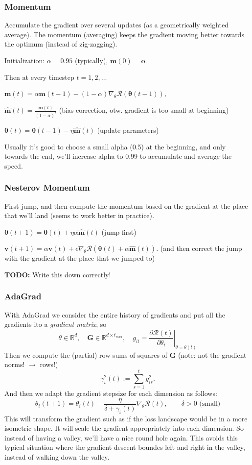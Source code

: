 \documentclass[a2paper,8pt]{extarticle}
\newcommand{\R}{\mathbb{R}}
\newcommand{\cR}{\mathcal{R}}
\newcommand{\mat}[1]{\mathbf{#1}}
\renewcommand{\vec}[1]{\mathbf{#1}}
\newcommand{\vm}{\vec{m}}
\newcommand{\vo}{\vec{o}}
\newcommand{\vv}{\vec{v}}
\newcommand{\vhm}{\widehat{\vec{m}}}
\newcommand{\vtheta}{\boldsymbol{\theta}}
\newcommand{\MG}{\mat{G}}
\newcommand{\evalat}[2]{\left. #1 \right|_{#2}}
\newcommand{\todo}[1]{\textbf{TODO:} #1}
\newcommand{\todo}[1]{%
}
\begin{document}
\begin{landscape}
\begin{multicols*}{7}
\subsubsection{Momentum}

Accumulate the gradient over several updates (as a geometrically weighted
average). The momentum (averaging) keeps the gradient moving better towards the
optimum (instead of zig-zagging).

Initialization: $\alpha=0.95$ (typically), $\vm(0)=\vo$.

Then at every timestep $t=1,2,\ldots$

$
\vm(t)=\alpha \vm(t-1)-(1-\alpha)\nabla_\theta\cR(\vtheta(t-1)),
$

$
\vhm(t)=\frac{\vm(t)}{(1-\alpha)^t}
$ \quad(bias correction, otw. gradient is too small at beginning)

$
\vtheta(t)=\vtheta(t-1)-\eta\vhm(t)
$ \quad (update parameters)

Usually it's good to choose a small alpha (0.5) at the beginning, and only
towards the end, we'll increase alpha to 0.99 to accumulate and average the
speed.

\subsubsection{Nesterov Momentum}

First jump, and then compute the momentum based on the gradient at the place
that we'll land (seems to work better in practice).

$
\vtheta(t+1)=\vtheta(t)+\eta\alpha\vhm(t)
$ (jump first)

$
\vv(t+1)=\alpha \vv(t) +
\epsilon\nabla_\theta\cR(\vtheta(t)+\alpha\vhm(t)).
$ (and then correct the jump with the gradient at the place that we jumped to)

\todo{Write this down correctly!}

\subsubsection{AdaGrad}

With AdaGrad we consider the entire history of gradients and put all the
gradients ito a \emph{gradient matrix}, so
\[
\theta\in\R^d,
\quad
\MG\in\R^{d\times t_{\max}},
\quad
g_{it}
=
\evalat{\frac{\partial \cR(t)}{\partial \theta_i}}{\theta=\theta(t)}
\]
Then we compute the (partial) row sums of squares of $\MG$ (note: not the
gradient norms! $\to$ rows!)
\[
\gamma_i^2(t):=\sum_{s=1}^tg_{is}^2.
\]
And then we adapt the gradient stepsize for each dimension as follows:
\[
\theta_i(t+1)=\theta_i(t)-\frac{\eta}{\delta+\gamma_i(t)}\nabla_\theta\cR(t),
\qquad
\delta>0\text{ (small)}
\]
This will transform the gradient such as if the loss landscape would be in a
more isometric shape. It will scale the gradient appropriately into each
dimension. So instead of having a valley, we'll have a nice round hole again.
This avoids this typical situation where the gradient descent boundes left and
right in the valley, instead of walking down the valley.


\end{multicols*}
\end{landscape}
\end{document}
